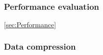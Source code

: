 



\subsubsection{Performance evaluation}
\ref{sec:Performance}



\subsubsection{Data compression}




